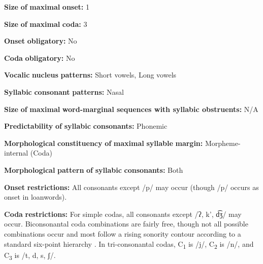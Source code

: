 \begin{styleBody}
\textbf{Size} \textbf{of} \textbf{maximal} \textbf{onset:} 1
\end{styleBody}

\begin{styleBody}
\textbf{Size} \textbf{of} \textbf{maximal} \textbf{coda:} 3
\end{styleBody}

\begin{styleBody}
\textbf{Onset} \textbf{obligatory:} No
\end{styleBody}

\begin{styleBody}
\textbf{Coda} \textbf{obligatory:} No
\end{styleBody}

\begin{styleBody}
\textbf{Vocalic} \textbf{nucleus} \textbf{patterns:} Short vowels, Long vowels
\end{styleBody}

\begin{styleBody}
\textbf{Syllabic} \textbf{consonant} \textbf{patterns:} Nasal
\end{styleBody}

\begin{styleBody}
\textbf{Size} \textbf{of} \textbf{maximal} \textbf{word{}-marginal sequences with syllabic obstruents:} N/A
\end{styleBody}

\begin{styleBody}
\textbf{Predictability} \textbf{of} \textbf{syllabic} \textbf{consonants:} Phonemic
\end{styleBody}

\begin{styleBody}
\textbf{Morphological} \textbf{constituency} \textbf{of} \textbf{maximal} \textbf{syllable} \textbf{margin:} Morpheme-internal (Coda)
\end{styleBody}

\begin{styleBody}
\textbf{Morphological} \textbf{pattern} \textbf{of} \textbf{syllabic} \textbf{consonants:} Both
\end{styleBody}

\begin{styleBody}
\textbf{Onset} \textbf{restrictions:} All consonants except /p/ may occur (though /p/ occurs as onset in loanwords).
\end{styleBody}

\begin{styleBody}
\textbf{Coda} \textbf{restrictions:} For simple codas, all consonants except /ʔ, k’, d͡ʒ/ may occur. Biconsonantal coda combinations are fairly free, though not all possible combinations occur and most follow a rising sonority contour according to a standard six-point hierarchy . In tri-consonantal codas, C\textsubscript{1} is /j/, C\textsubscript{2} is /n/, and C\textsubscript{3} is /t, d, s, ʃ/.
\end{styleBody}

